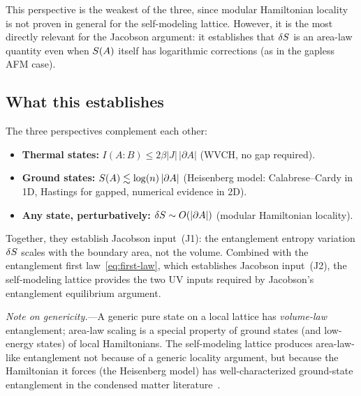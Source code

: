 This perspective is the weakest of the three, since modular
Hamiltonian locality is not proven in general for the self-modeling
lattice.  However, it is the most directly relevant for the Jacobson
argument: it establishes that $\delta S$ is an area-law quantity even
when $S(A)$ itself has logarithmic corrections (as in the gapless
AFM case).

\subsection{What this establishes}
\label{sec:area-summary}

The three perspectives complement each other:
\begin{itemize}
\item \textbf{Thermal states:} $I(A{:}B) \leq 2\beta|J|\,|\partial A|$
  (WVCH, no gap required).
\item \textbf{Ground states:} $S(A) \lesssim \log(n)\,|\partial A|$
  (Heisenberg model: Calabrese--Cardy in 1D, Hastings for gapped,
  numerical evidence in 2D).
\item \textbf{Any state, perturbatively:}
  $\delta S \sim O(|\partial A|)$ (modular Hamiltonian locality).
\end{itemize}
Together, they establish Jacobson input~(J1): the entanglement entropy
variation $\delta S$ scales with the boundary area, not the volume.
Combined with the entanglement first law~\eqref{eq:first-law}, which
establishes Jacobson input~(J2), the self-modeling lattice provides the
two UV inputs required by Jacobson's entanglement equilibrium
argument.

\emph{Note on genericity.}---A generic pure state on a local lattice
has \emph{volume-law} entanglement; area-law scaling is a special
property of ground states (and low-energy states) of local
Hamiltonians.  The self-modeling lattice produces area-law-like
entanglement not because of a generic locality argument, but because
the Hamiltonian it forces (the Heisenberg model) has well-characterized
ground-state entanglement in the condensed matter
literature~\cite{EisertCramerPlenio2010}.
